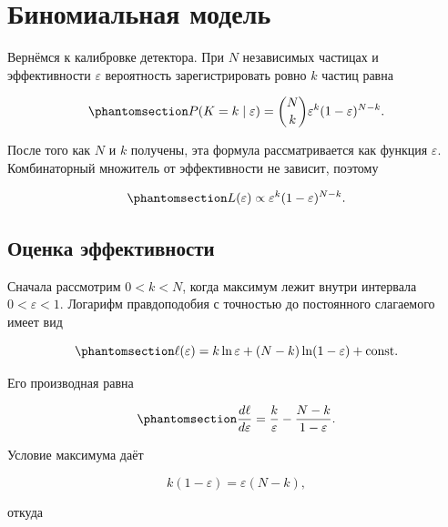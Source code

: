 \documentclass[
  russian,
  11pt,
  a4paper,
  open=any]{scrbook}
\begin{document}
\section{Биномиальная
модель}\label{ux431ux438ux43dux43eux43cux438ux430ux43bux44cux43dux430ux44f-ux43cux43eux434ux435ux43bux44c}

Вернёмся к калибровке детектора. При \(N\) независимых частицах и
эффективности \(\varepsilon\) вероятность зарегистрировать ровно \(k\)
частиц равна

\begin{equation}\protect\phantomsection\label{eq-ch9-binomial-probability}{
P(K=k\mid\varepsilon)
=\binom Nk\varepsilon^k(1-\varepsilon)^{N-k}.
}\end{equation}

После того как \(N\) и \(k\) получены, эта формула рассматривается как
функция \(\varepsilon\). Комбинаторный множитель от эффективности не
зависит, поэтому

\begin{equation}\protect\phantomsection\label{eq-ch9-binomial-likelihood}{
L(\varepsilon)
\propto\varepsilon^k(1-\varepsilon)^{N-k}.
}\end{equation}

\subsection{Оценка
эффективности}\label{ux43eux446ux435ux43dux43aux430-ux44dux444ux444ux435ux43aux442ux438ux432ux43dux43eux441ux442ux438}

Сначала рассмотрим \(0<k<N\), когда максимум лежит внутри интервала
\(0<\varepsilon<1\). Логарифм правдоподобия с точностью до постоянного
слагаемого имеет вид

\begin{equation}\protect\phantomsection\label{eq-ch9-binomial-log-likelihood}{
\ell(\varepsilon)
=k\ln\varepsilon+(N-k)\ln(1-\varepsilon)+\mathrm{const}.
}\end{equation}

Его производная равна

\begin{equation}\protect\phantomsection\label{eq-ch9-binomial-score}{
\frac{d\ell}{d\varepsilon}
=\frac{k}{\varepsilon}-\frac{N-k}{1-\varepsilon}.
}\end{equation}

Условие максимума даёт

\[
k(1-\varepsilon)=\varepsilon(N-k),
\]

откуда
\end{document}
